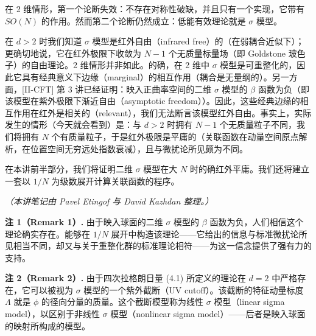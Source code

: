在 2 维情形，第一个论断失效：不存在对称性破缺，并且只有一个实现，它带有 $SO(N)$ 的作用。然而第二个论断仍然成立：低能有效理论就是 $\sigma$ 模型。

在 $d>2$ 时我们知道 $\sigma$ 模型是红外自由（infrared free）的（在弱耦合近似下）；更确切地说，它在红外极限下收敛为 $N-1$ 个无质量标量场（即 Goldstone 玻色子）的自由理论。2 维情形并非如此。的确，在 2 维中 $\sigma$ 模型是可重整化的，因此它具有经典意义下边缘（marginal）的相互作用（耦合是无量纲的）。另一方面，[II-CFT] 第 3 讲已经证明：映入正曲率空间的二维 $\sigma$ 模型的 $\beta$ 函数为负（即该模型在紫外极限下渐近自由（asymptotic freedom））。因此，这些经典边缘的相互作用在红外是相关的（relevant），我们无法断言该模型红外自由。事实上，实际发生的情形（今天就会看到）是：与 $d>2$ 时拥有 $N-1$ 个无质量粒子不同，我们将拥有 $N$ 个有质量粒子，于是红外极限是平庸的（关联函数在动量空间原点解析，在位置空间无穷远处指数衰减），且与微扰论所见颇为不同。

在本讲前半部分，我们将证明二维 $\sigma$ 模型在大 $N$ 时的确红外平庸。我们还将建立一套以 $1/N$ 为级数展开计算关联函数的程序。

\noindent\textit{（本讲笔记由 Pavel Etingof 与 David Kazhdan 整理。）}



\textbf{注 1（Remark 1）.} 由于映入球面的二维 $\sigma$ 模型的 $\beta$ 函数为负，人们相信这个理论确实存在。能够在 $1/N$ 展开中构造该理论——它给出的信息与标准微扰论所见相当不同，却又与关于重整化群的标准理论相符——为这一信念提供了强有力的支持。

\textbf{注 2（Remark 2）.} 由于四次拉格朗日量 (4.1) 所定义的理论在 $d=2$ 中严格存在，它可以被视为 $\sigma$ 模型的一个紫外截断（UV cutoff）。该截断的特征动量标度 $\Lambda$ 就是 $\phi$ 的径向分量的质量。这个截断模型称为线性 $\sigma$ 模型（linear sigma model），以区别于非线性 $\sigma$ 模型（nonlinear sigma model）——后者是映入球面的映射所构成的模型。

